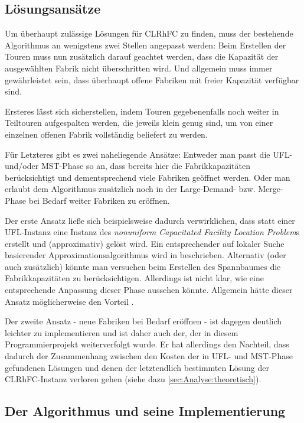 \documentclass[a4paper,ngerman,11pt,bibtotoc]{scrartcl}
\theoremstyle{definition}
\theoremstyle{plain}
\theoremstyle{remark}
\newcommand{\CLRHFC}{CLRhFC}
\newcommand{\MST}{MST}
\newcommand{\UFL}{UFL}
\begin{document}
	\subsection{Lösungsansätze}
	
	Um überhaupt zulässige Lösungen für \CLRHFC{} zu finden, muss der bestehende Algorithmus an wenigstens zwei Stellen angepasst werden: Beim Erstellen der Touren muss nun zusätzlich darauf geachtet werden, dass die Kapazität der ausgewählten Fabrik nicht überschritten wird. Und allgemein muss immer gewährleistet sein, dass überhaupt offene Fabriken mit freier Kapazität verfügbar sind.
	
	Ersteres lässt sich sicherstellen, indem Touren gegebenenfalls noch weiter in Teiltouren aufgespalten werden, die jeweils klein genug sind, um von einer einzelnen offenen Fabrik vollständig beliefert zu werden.
	
	Für Letzteres gibt es zwei naheliegende Ansätze: Entweder man passt die \UFL- und/oder \MST-Phase so an, dass bereits hier die Fabrikkapazitäten berücksichtigt und dementsprechend viele Fabriken geöffnet werden. Oder man erlaubt dem Algorithmus zusätzlich noch in der Large-Demand- bzw. Merge-Phase bei Bedarf weiter Fabriken zu eröffnen. 
	
	Der erste Ansatz ließe sich beispielsweise dadurch verwirklichen, dass statt einer \UFL-Instanz eine Instanz des \emph{nonuniform Capacitated Facility Location Problem}s erstellt und (approximativ) gelöst wird. Ein entsprechender auf lokaler Suche basierender Approximationsalgorithmus wird in \cite{Pal01facilitylocation} beschrieben. Alternativ (oder auch zusätzlich) könnte man versuchen beim Erstellen des Spannbaumes die Fabrikkapazitäten zu berücksichtigen. Allerdings ist nicht klar, wie eine entsprechende Anpassung dieser Phase aussehen könnte. Allgemein hätte dieser Ansatz möglicherweise den Vorteil . 
	
	Der zweite Ansatz - neue Fabriken bei Bedarf eröffnen - ist dagegen deutlich leichter zu implementieren und ist daher auch der, der in diesem Programmierprojekt weiterverfolgt wurde. Er hat allerdings den Nachteil, dass dadurch der Zusammenhang zwischen den Kosten der in \UFL- und \MST-Phase gefundenen Lösungen und denen der letztendlich bestimmten Lösung der \CLRHFC-Instanz verloren gehen (siehe dazu \cref{sec:Analyse:theoretisch}).

	\subsection{Der Algorithmus und seine Implementierung}
	
\end{document}

